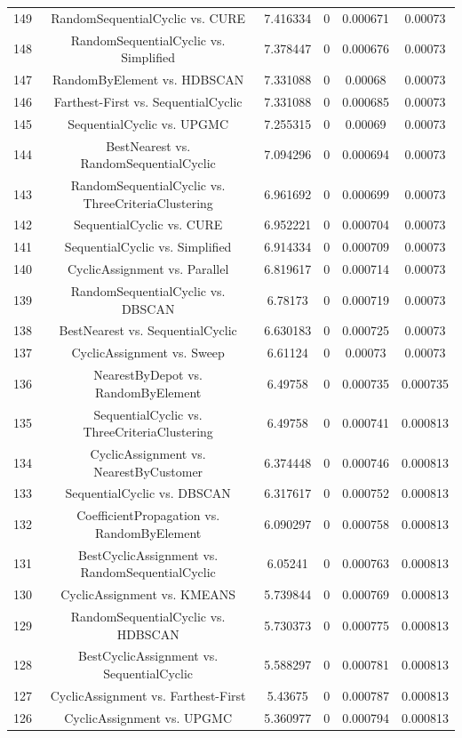 \documentclass[a4paper,10pt]{article}
\begin{document}
\begin{landscape}
\begin{table}[!htp]
\begin{tabular}{cccccc}
149&RandomSequentialCyclic vs. CURE&7.416334&0&0.000671&0.00073\\
148&RandomSequentialCyclic vs. Simplified&7.378447&0&0.000676&0.00073\\
147&RandomByElement vs. HDBSCAN&7.331088&0&0.00068&0.00073\\
146&Farthest-First vs. SequentialCyclic&7.331088&0&0.000685&0.00073\\
145&SequentialCyclic vs. UPGMC&7.255315&0&0.00069&0.00073\\
144&BestNearest vs. RandomSequentialCyclic&7.094296&0&0.000694&0.00073\\
143&RandomSequentialCyclic vs. ThreeCriteriaClustering&6.961692&0&0.000699&0.00073\\
142&SequentialCyclic vs. CURE&6.952221&0&0.000704&0.00073\\
141&SequentialCyclic vs. Simplified&6.914334&0&0.000709&0.00073\\
140&CyclicAssignment vs. Parallel&6.819617&0&0.000714&0.00073\\
139&RandomSequentialCyclic vs. DBSCAN&6.78173&0&0.000719&0.00073\\
138&BestNearest vs. SequentialCyclic&6.630183&0&0.000725&0.00073\\
137&CyclicAssignment vs. Sweep&6.61124&0&0.00073&0.00073\\
136&NearestByDepot vs. RandomByElement&6.49758&0&0.000735&0.000735\\
135&SequentialCyclic vs. ThreeCriteriaClustering&6.49758&0&0.000741&0.000813\\
134&CyclicAssignment vs. NearestByCustomer&6.374448&0&0.000746&0.000813\\
133&SequentialCyclic vs. DBSCAN&6.317617&0&0.000752&0.000813\\
132&CoefficientPropagation vs. RandomByElement&6.090297&0&0.000758&0.000813\\
131&BestCyclicAssignment vs. RandomSequentialCyclic&6.05241&0&0.000763&0.000813\\
130&CyclicAssignment vs. KMEANS&5.739844&0&0.000769&0.000813\\
129&RandomSequentialCyclic vs. HDBSCAN&5.730373&0&0.000775&0.000813\\
128&BestCyclicAssignment vs. SequentialCyclic&5.588297&0&0.000781&0.000813\\
127&CyclicAssignment vs. Farthest-First&5.43675&0&0.000787&0.000813\\
126&CyclicAssignment vs. UPGMC&5.360977&0&0.000794&0.000813\\

\end{tabular}
\end{table}
\end{landscape}
\end{document}
